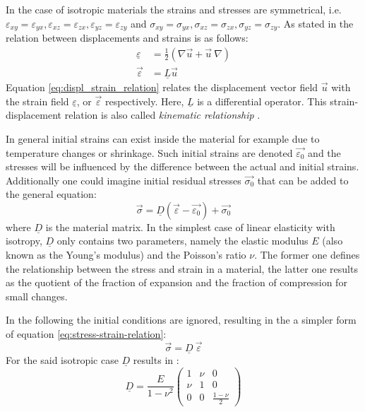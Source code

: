  In the case of isotropic materials the strains and stresses are symmetrical, i.e. $\varepsilon_{xy} = \varepsilon_{yx}, \varepsilon_{xz} = \varepsilon_{zx}, \varepsilon_{yz} = \varepsilon_{zy}$ and $\sigma_{xy} = \sigma_{yx}, \sigma_{xz} = \sigma_{zx}, \sigma_{yz} = \sigma_{zy}$. As stated in \cite{steinke2005finite} the relation between displacements and strains is as follows:
 \begin{align}\label{eq:displ_strain_relation}
 \underline{\varepsilon} &= \frac{1}{2}\left(\nabla\vec{u} + \vec{u}\:\nabla \right) \\
 \vec{\varepsilon} &= \underline{L}\vec{u} \nonumber
 \end{align}
 Equation \eqref{eq:displ_strain_relation} relates the displacement vector field $\vec{u}$ with the strain field $\underline{\varepsilon}$, or $\vec{\varepsilon}$ respectively. Here, $\underline{L}$ is a differential operator. This strain-displacement relation is also called \textit{kinematic relationship} \cite{steinke2005finite}.
 
 In general initial strains can exist inside the material for example due to temperature changes or shrinkage. Such initial strains are denoted $\vec{\varepsilon_0}$ and the stresses will be influenced by the difference between the actual and initial strains. Additionally one could imagine initial residual stresses $\vec{\sigma_0}$ that can be added to the general equation:
 \begin{equation}\label{eq:stress-strain-relation}
 \vec{\sigma} = \underline{D}\left(\vec{\varepsilon}-\vec{\varepsilon_0}\right)+\vec{\sigma_0}
 \end{equation}
 where $\underline{D}$ is the material matrix. In the simplest case of linear elasticity with isotropy, $\underline{D}$ only contains two parameters, namely the elastic modulus $E$ (also known as the Young's modulus) and the Poisson's ratio $\nu$. The former one defines the relationship between the stress and strain in a material, the latter one results as the quotient of the fraction of expansion and the fraction of compression for small changes.
 
 In the following the initial conditions are ignored, resulting in the a simpler form of equation \eqref{eq:stress-strain-relation}:
 \begin{equation}
 \vec{\sigma} = \underline{D}\ \vec{\varepsilon}
 \end{equation}
 For the said isotropic case $\underline{D}$ results in \cite{zienkiewicz2000finite}:
 \begin{equation}
 \underline{D} = \frac{E}{1-\nu^2}\begin{pmatrix}
 1 & \nu & 0 \\
 \nu & 1 & 0 \\
 0 & 0 & \frac{1-\nu}{2}
 \end{pmatrix}
 \end{equation}
 
